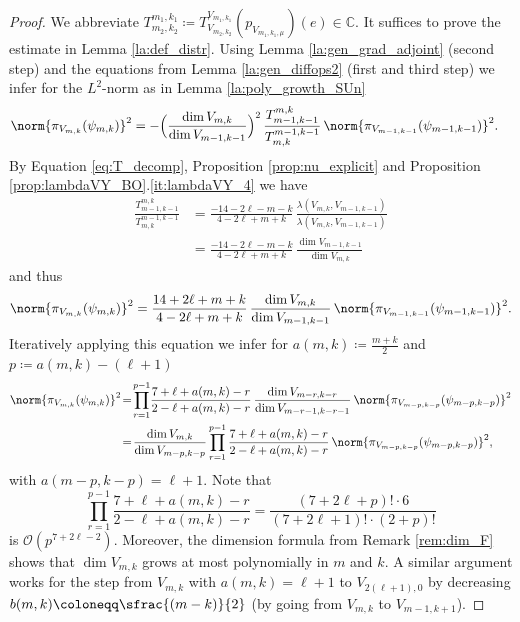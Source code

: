 \documentclass[JEP,XML,SOM,NoFloatCountersInSection,Unicode,published]{cedram}
\newcommand{\psfrac}[2]{\sfrac{(#1)}{#2}}
\theoremstyle{definition}
\DeclarePairedDelimiter{\norm}\lVert\rVert
\newcommand{\mc}[1]{\ensuremath{\mathcal{#1}}}
\newcommand{\C}{\ensuremath{\mathbb{C}}}
\begin{document}
\begin{proof}
We abbreviate $T^{m_1,k_1}_{m_2,k_2}\coloneqq T_{V_{m_2,k_2}}^{V_{m_1,k_1}}(p_{V_{m_1,k_1,\mu}})(e)\in\C$. It suffices to prove the estimate in Lemma \ref{la:def_distr}. Using Lemma \ref{la:gen_grad_adjoint} (second step) and the equations from Lemma \ref{la:gen_diffops2} (first and third step) we infer for the $L^2$-norm as in Lemma \ref{la:poly_growth_SUn}
\begin{align*}
\norm{\pi_{V_{m,k}}(\psi_{m,k})}^2&=
-\Bigl(\frac{\dim V_{m,k}}{\dim V_{m-1,k-1}}\Bigr)^2\,\frac{T^{m,k}_{m-1,k-1}}{T^{m-1,k-1}_{m,k}}\,\norm{\pi_{V_{m-1,k-1}}(\psi_{m-1,k-1})}^2.
\end{align*}
By Equation \eqref{eq:T_decomp}, Proposition \ref{prop:nu_explicit} and Proposition \ref{prop:lambdaVY_BO}.\ref{it:lambdaVY_4} we have
\begin{align*}
\frac{T^{m,k}_{m-1,k-1}}{T^{m-1,k-1}_{m,k}}&=\frac{-14-2\ell-m-k}{4-2\ell+m+k}\,\frac{\lambda(V_{m,k},V_{m-1,k-1})}{\lambda(V_{m,k},V_{m-1,k-1})}\\
&=\frac{-14-2\ell-m-k}{4-2\ell+m+k}\,\frac{\dim V_{m-1,k-1}}{\dim V_{m,k}}
\end{align*}
and thus
\[
\norm{\pi_{V_{m,k}}(\psi_{m,k})}^2=\frac{14+2\ell+m+k}{4-2\ell+m+k}\,\frac{\dim V_{m,k}}{\dim V_{m-1,k-1}}\,\norm{\pi_{V_{m-1,k-1}}(\psi_{m-1,k-1})}^2.
\]
Iteratively applying this equation we infer for $a(m,k)\coloneqq\frac{m+k}{2}$ and $p\coloneqq a(m,k)-(\ell+1)$
\begin{align*}
\norm{\pi_{V_{m,k}}(\psi_{m,k})}^2&\!=\!\prod_{r=1}^{p-1}\!\frac{7+\ell+a(m,k)-r}{2-\ell+a(m,k)-r}\,\frac{\dim V_{m-r,k-r}}{\dim V_{m-r-1,k-r-1}}\,\norm{\pi_{V_{m-p,k-p}}(\psi_{m-p,k-p})}^2\\
&\!=\!\frac{\dim V_{m,k}}{\dim V_{m-p,k-p}}\prod_{r=1}^{p-1}\frac{7+\ell+a(m,k)-r}{2-\ell+a(m,k)-r}\,\norm{\pi_{V_{m-p,k-p}}(\psi_{m-p,k-p})}^2,
\end{align*}
with $a(m-p,k-p)=\ell+1$. Note that
\[
\prod_{r=1}^{p-1}\frac{7+\ell+a(m,k)-r}{2-\ell+a(m,k)-r}=\frac{(7+2\ell+p)!\cdot 6}{(7+2\ell+1)!\cdot(2+p)!}
\]
is $\mc O(p^{7+2\ell-2})$. Moreover, the dimension formula from Remark \ref{rem:dim_F} shows that $\dim V_{m,k}$ grows at most polynomially in $m$ and $k$. A similar argument works for the step from $V_{m,k}$ with $a(m,k)=\ell+1$ to $V_{2(\ell+1),0}$ by decreasing $b(m,k)\coloneqq\psfrac{m-k}{2}$ (by going from $V_{m,k}$ to $V_{m-1,k+1}$).
\end{proof}
\end{document}
